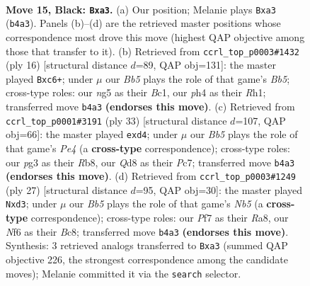 \documentclass[11pt]{article}
\begin{document}
\clearpage

\begin{figure}[p]\centering
\begin{subfigure}{0.46\textwidth}\centering
\resizebox{\linewidth}{!}{%
\newchessgame
\chessboard[
  setfen={rnbq1k2/p4pp1/1pr2n2/3p2Np/Pb1P3P/BPNB2P1/3K1P2/R2Q3R b - - 4 15},
  showmover=false,
  pgfstyle=straightmove, color=movearrow, markmove={b4-a3}
]}
\caption{}
\end{subfigure}\hfill
\begin{subfigure}{0.46\textwidth}\centering
\resizebox{\linewidth}{!}{%
\newchessgame
\chessboard[
  setfen={r2qkb1r/1pp2ppp/p1n5/1B1pP3/6b1/2PP1N2/P1P3PP/R1BQK2R w KQkq - 0 9},
  showmover=false,
  pgfstyle=straightmove, color=movearrow, markmove={b5-c6}
]}
\caption{}
\end{subfigure}
\\[4pt]
\begin{subfigure}{0.46\textwidth}\centering
\resizebox{\linewidth}{!}{%
\newchessgame
\chessboard[
  setfen={1r4k1/1ppqnrbp/3p2p1/3Np3/1PPBP1b1/6P1/4NPBP/1R1QR1K1 b - - 0 17},
  showmover=false,
  pgfstyle=straightmove, color=movearrow, markmove={e5-d4}
]}
\caption{}
\end{subfigure}\hfill
\begin{subfigure}{0.46\textwidth}\centering
\resizebox{\linewidth}{!}{%
\newchessgame
\chessboard[
  setfen={r1b1k2r/1p1nqppp/p3p3/P2pN3/1n1P1P2/2NBP3/1P4PP/R2Q1RK1 b kq - 0 14},
  showmover=false,
  pgfstyle=straightmove, color=movearrow, markmove={b4-d3}
]}
\caption{}
\end{subfigure}
\caption{\textbf{Move 15, Black: \texttt{Bxa3}.} (a) Our position; Melanie plays \texttt{Bxa3} (\texttt{b4a3}). Panels (b)--(d) are the retrieved master positions whose correspondence most drove this move (highest QAP objective among those that transfer to it). (b) Retrieved from \texttt{ccrl\_top\_p0003\#1432} (ply 16) [structural distance $d$=89, QAP obj=131]: the master played \texttt{Bxc6+}; under $\mu$ our \emph{Bb5} plays the role of that game's \emph{Bb5}; cross-type roles: our \emph{n}g5 as their \emph{B}c1, our \emph{p}h4 as their \emph{R}h1; transferred move \texttt{b4a3} \textbf{(endorses this move)}. (c) Retrieved from \texttt{ccrl\_top\_p0001\#3191} (ply 33) [structural distance $d$=107, QAP obj=66]: the master played \texttt{exd4}; under $\mu$ our \emph{Bb5} plays the role of that game's \emph{Pe4} (a \textbf{cross-type} correspondence); cross-type roles: our \emph{p}g3 as their \emph{R}b8, our \emph{Q}d8 as their \emph{P}c7; transferred move \texttt{b4a3} \textbf{(endorses this move)}. (d) Retrieved from \texttt{ccrl\_top\_p0003\#1249} (ply 27) [structural distance $d$=95, QAP obj=30]: the master played \texttt{Nxd3}; under $\mu$ our \emph{Bb5} plays the role of that game's \emph{Nb5} (a \textbf{cross-type} correspondence); cross-type roles: our \emph{P}f7 as their \emph{R}a8, our \emph{N}f6 as their \emph{B}c8; transferred move \texttt{b4a3} \textbf{(endorses this move)}. Synthesis: 3 retrieved analogs transferred to \texttt{Bxa3} (summed QAP objective 226, the strongest correspondence among the candidate moves); Melanie committed it via the \texttt{search} selector.}
\label{fig:thought-m29}
\end{figure}
\end{document}
